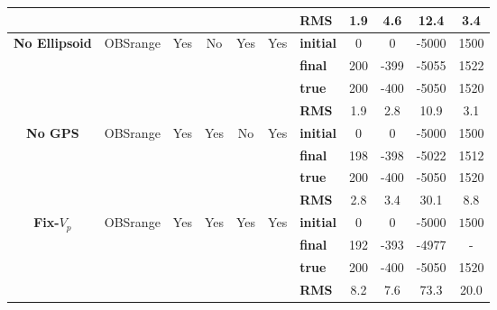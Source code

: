 \begin{table}
{\begin{tabular}{c | c c c c c | l c c c c}
\multirow{4}{*}{} & \multirow{4}{*}{} & \multirow{4}{*}{} & \multirow{4}{*}{} & \multirow{4}{*}{} & \multirow{4}{*}{} & \textbf{RMS} & 1.9 & 4.6 & 12.4 & 3.4 \\ 
\hline
\multirow{4}{*}{\textbf{No Ellipsoid}} & \multirow{4}{*}{OBSrange} & \multirow{4}{*}{Yes} & \multirow{4}{*}{No} & \multirow{4}{*}{Yes} & \multirow{4}{*}{Yes} & \textbf{initial} & 0 & 0 & -5000 & 1500 \\ 
\multirow{4}{*}{} & \multirow{4}{*}{} & \multirow{4}{*}{} & \multirow{4}{*}{} & \multirow{4}{*}{} & \multirow{4}{*}{} & \textbf{final}& 200 & -399 & -5055 & 1522 \\ 
\multirow{4}{*}{} & \multirow{4}{*}{} & \multirow{4}{*}{} & \multirow{4}{*}{} & \multirow{4}{*}{} & \multirow{4}{*}{} & \textbf{true}& 200 & -400 & -5050 & 1520 \\ 
\multirow{4}{*}{} & \multirow{4}{*}{} & \multirow{4}{*}{} & \multirow{4}{*}{} & \multirow{4}{*}{} & \multirow{4}{*}{} & \textbf{RMS} & 1.9 & 2.8 & 10.9 & 3.1 \\ 
\hline
\multirow{4}{*}{\textbf{No GPS}} & \multirow{4}{*}{OBSrange} & \multirow{4}{*}{Yes} & \multirow{4}{*}{Yes} & \multirow{4}{*}{No} & \multirow{4}{*}{Yes} & \textbf{initial} & 0 & 0 & -5000 & 1500 \\ 
\multirow{4}{*}{} & \multirow{4}{*}{} & \multirow{4}{*}{} & \multirow{4}{*}{} & \multirow{4}{*}{} & \multirow{4}{*}{} & \textbf{final}& 198 & -398 & -5022 & 1512 \\ 
\multirow{4}{*}{} & \multirow{4}{*}{} & \multirow{4}{*}{} & \multirow{4}{*}{} & \multirow{4}{*}{} & \multirow{4}{*}{} & \textbf{true}& 200 & -400 & -5050 & 1520 \\ 
\multirow{4}{*}{} & \multirow{4}{*}{} & \multirow{4}{*}{} & \multirow{4}{*}{} & \multirow{4}{*}{} & \multirow{4}{*}{} & \textbf{RMS} & 2.8 & 3.4 & 30.1 & 8.8 \\ 
\hline
\multirow{4}{*}{\textbf{Fix-$V_p$}} & \multirow{4}{*}{OBSrange} & \multirow{4}{*}{Yes} & \multirow{4}{*}{Yes} & \multirow{4}{*}{Yes} & \multirow{4}{*}{Yes} & \textbf{initial} & 0 & 0 & -5000 & $\mathit{1500}$ \\ 
\multirow{4}{*}{} & \multirow{4}{*}{} & \multirow{4}{*}{} & \multirow{4}{*}{} & \multirow{4}{*}{} & \multirow{4}{*}{} & \textbf{final}& 192 & -393 & -4977 & - \\ 
\multirow{4}{*}{} & \multirow{4}{*}{} & \multirow{4}{*}{} & \multirow{4}{*}{} & \multirow{4}{*}{} & \multirow{4}{*}{} & \textbf{true}& 200 & -400 & -5050 & 1520 \\ 
\multirow{4}{*}{} & \multirow{4}{*}{} & \multirow{4}{*}{} & \multirow{4}{*}{} & \multirow{4}{*}{} & \multirow{4}{*}{} & \textbf{RMS} & 8.2 & 7.6 & 73.3 & 20.0 \\ 

\end{tabular}}
\end{table}
